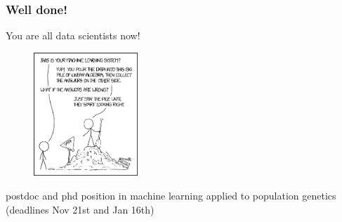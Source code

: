 \documentclass{beamer}
\begin{document}












\begin{frame}
	\frametitle{Well done!}

	\small{You are all data scientists now!}

	\begin{figure}
                \includegraphics[width=0.35\textwidth]{Pics/machine_learning.png}
        \end{figure}

	\small{postdoc and phd position in machine learning applied to population genetics \tiny{(deadlines Nov 21st and Jan 16th)}}

\end{frame}
\end{document}
